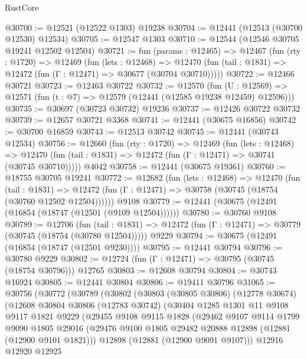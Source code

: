 \begin{lexlean}{RustCore}
\begin{coremodule}
@30700 := @12521 (@12522 @1303) @19238
@30704 := @12441 (@12513 (@30700 @12530) @12534)
@30705 := @12547 @1303
@30710 := @12544 (@12546 @30705 @19241 @12502 @12504)
@30721 := fun (params : @12465) =>
  @12467
    (fun (rty : @1720) =>
    @12469
      (fun (lets : @12468) =>
      @12470 (fun (tail : @1831) => @12472 (fun (Γ : @12471) => @30677 (@30704 @30710)))))
@30722 := @12466 @30721
@30723 := @12463 @30722
@30732 := @12570
    (fun (U : @12569) => @12571 (fun (t : @7) => @12579 (@12441 (@12585 @19238 @12459) @12596)))
@30735 := @30697 (@30723 @30732) @19236
@30737 := @12426 @30722 @30732
@30739 := @12657 @30721 @3368
@30741 := @12441 (@30675 @16856)
@30742 := @30700 @16859
@30743 := @12513 @30742
@30745 := @12441 (@30743 @12534)
@30756 := @12660
    (fun (rty : @1720) =>
    @12469
      (fun (lets : @12468) =>
      @12470 (fun (tail : @1831) => @12472 (fun (Γ : @12471) => @30741 (@30745 @30710)))))
    @4042
@30758 := @12441 (@30675 @19361)
@30760 := @18755 @30705 @19241
@30772 := @12682
    (fun (lets : @12468) =>
    @12470
      (fun (tail : @1831) =>
      @12472 (fun (Γ : @12471) => @30758 (@30745 (@18754 (@30760 @12502 @12504))))))
    @9108
@30779 := @12441 (@30675 (@12491 (@16854 (@18747 (@12501 (@9109 @12504))))))
@30780 := @30760 @9108
@30789 := @12706
    (fun (tail : @1831) => @12472 (fun (Γ : @12471) => @30779 (@30745 (@18754 (@30780 @12504)))))
    @9229
@30794 := @30675 (@12491 (@16854 (@18747 (@12501 @9230))))
@30795 := @12441 @30794
@30796 := @30780 @9229
@30802 := @12724 (fun (Γ : @12471) => @30795 (@30745 (@18754 @30796))) @12765
@30803 := @12608 @30794
@30804 := @30743 @16924
@30805 := @12441 @30804
@30806 := @19411 @30796
@31065 := @30756
    (@30772
      (@30789
        (@30802
          (@30803
            (@30805 @30806)
            (@12778 @30674)
            (@12608
              @30804
              @30806
              (@12783 @30742)
              (@30404
                @1285
                @1301
                @11
                @9108
                @9117
                @1821
                @9229
                (@29455
                  @9108
                  @9115
                  @1828
                  (@29462
                    @9107
                    @9114
                    @1799
                    @9090
                    @1805
                    @29016
                    (@29476 @9100 @1805 @29482 @20888 @12898 (@12881 (@12900 @9101 @1821)))
                    @12898
                    (@12881 (@12900 @9091 @9107)))
                  @12916
                  @12920
                  @12925

\end{coremodule}
\end{lexlean}
